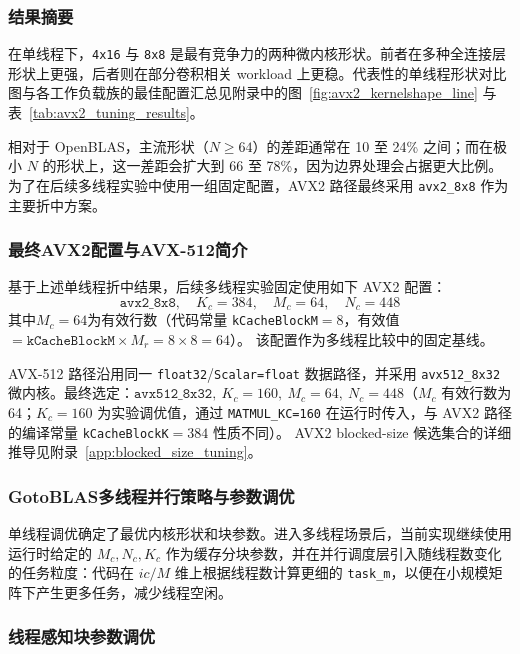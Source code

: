 \documentclass[a4paper,11pt,oneside]{article}
\begin{document}
\subsubsection{结果摘要}

在单线程下，\texttt{4x16} 与 \texttt{8x8} 是最有竞争力的两种微内核形状。前者在多种全连接层形状上更强，后者则在部分卷积相关 workload 上更稳。代表性的单线程形状对比图与各工作负载族的最佳配置汇总见附录中的图~\ref{fig:avx2_kernelshape_line} 与表~\ref{tab:avx2_tuning_results}。

相对于 OpenBLAS，主流形状（$N \geq 64$）的差距通常在 10 至 24\% 之间；而在极小 $N$ 的形状上，这一差距会扩大到 66 至 78\%，因为边界处理会占据更大比例。为了在后续多线程实验中使用一组固定配置，AVX2 路径最终采用 \texttt{avx2\_8x8} 作为主要折中方案。

\subsubsection{最终AVX2配置与AVX-512简介}\label{sec:avx512_brief}

基于上述单线程折中结果，后续多线程实验固定使用如下 AVX2 配置：
\[
\texttt{avx2\_8x8},\quad K_c = 384,\quad M_c = 64,\quad N_c = 448
\]
其中$M_c=64$为有效行数（代码常量 \texttt{kCacheBlockM}$=8$，有效值$= \texttt{kCacheBlockM} \times M_r = 8 \times 8 = 64$）。
该配置作为多线程比较中的固定基线。

AVX-512 路径沿用同一 \texttt{float32}/\texttt{Scalar=float} 数据路径，并采用 \texttt{avx512\_8x32} 微内核。最终选定：$\texttt{avx512\_8x32},\ K_c=160,\ M_c=64,\ N_c=448$（$M_c$ 有效行数为 64；$K_c=160$ 为实验调优值，通过 \texttt{MATMUL\_KC=160} 在运行时传入，与 AVX2 路径的编译常量 \texttt{kCacheBlockK}$=384$ 性质不同）。
AVX2 blocked-size 候选集合的详细推导见附录~\ref{app:blocked_size_tuning}。

\subsubsection{GotoBLAS多线程并行策略与参数调优}\label{sec:gotoblas_mt}

单线程调优确定了最优内核形状和块参数。进入多线程场景后，当前实现继续使用运行时给定的 $M_c, N_c, K_c$ 作为缓存分块参数，并在并行调度层引入随线程数变化的任务粒度：代码在 $ic/M$ 维上根据线程数计算更细的 \texttt{task\_m}，以便在小规模矩阵下产生更多任务，减少线程空闲。

\subsubsection{线程感知块参数调优}
\end{document}
